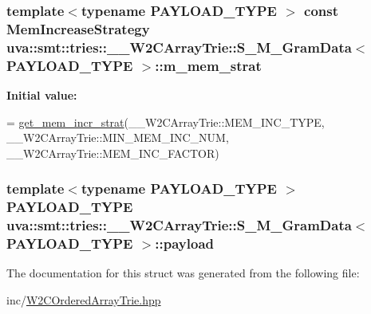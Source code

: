 \subsubsection[{m\+\_\+mem\+\_\+strat}]{\setlength{\rightskip}{0pt plus 5cm}template$<$typename P\+A\+Y\+L\+O\+A\+D\+\_\+\+T\+Y\+P\+E $>$ const {\bf Mem\+Increase\+Strategy} {\bf uva\+::smt\+::tries\+::\+\_\+\+\_\+\+W2\+C\+Array\+Trie\+::\+S\+\_\+\+M\+\_\+\+Gram\+Data}$<$ P\+A\+Y\+L\+O\+A\+D\+\_\+\+T\+Y\+P\+E $>$\+::m\+\_\+mem\+\_\+strat\hspace{0.3cm}{\ttfamily [static]}}\label{structuva_1_1smt_1_1tries_1_1_____w2_c_array_trie_1_1_s___m___gram_data_ab43d2623c5c8458997acfe0962581de9}
{\bfseries Initial value\+:}
\begin{DoxyCode}
=
                \hyperlink{namespaceuva_1_1smt_1_1tries_1_1alloc_aa5cce127acd56e3fa1b42c63f93f8548}{get\_mem\_incr\_strat}(\_\_W2CArrayTrie::MEM\_INC\_TYPE,
                        \_\_W2CArrayTrie::MIN\_MEM\_INC\_NUM, \_\_W2CArrayTrie::MEM\_INC\_FACTOR)
\end{DoxyCode}
\hypertarget{structuva_1_1smt_1_1tries_1_1_____w2_c_array_trie_1_1_s___m___gram_data_ac2a195c43c50814014c62157798c4c8a}{}
\subsubsection[{payload}]{\setlength{\rightskip}{0pt plus 5cm}template$<$typename P\+A\+Y\+L\+O\+A\+D\+\_\+\+T\+Y\+P\+E $>$ P\+A\+Y\+L\+O\+A\+D\+\_\+\+T\+Y\+P\+E {\bf uva\+::smt\+::tries\+::\+\_\+\+\_\+\+W2\+C\+Array\+Trie\+::\+S\+\_\+\+M\+\_\+\+Gram\+Data}$<$ P\+A\+Y\+L\+O\+A\+D\+\_\+\+T\+Y\+P\+E $>$\+::payload}\label{structuva_1_1smt_1_1tries_1_1_____w2_c_array_trie_1_1_s___m___gram_data_ac2a195c43c50814014c62157798c4c8a}


The documentation for this struct was generated from the following file\+:\begin{DoxyCompactItemize}
\item 
inc/\hyperlink{_w2_c_ordered_array_trie_8hpp}{W2\+C\+Ordered\+Array\+Trie.\+hpp}\end{DoxyCompactItemize}

